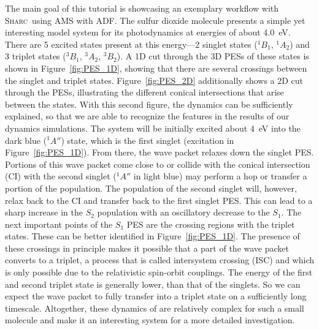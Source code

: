 \documentclass[a4paper,11pt,DIV=15,openany]{scrbook}
\newcommand{\sharc}{\textsc{Sharc}}
\begin{document}
The main goal of this tutorial is showcasing an exemplary workflow with \sharc\ using \textsc{AMS} with \textsc{ADF}. 
The sulfur dioxide molecule presents a simple yet interesting model system for its photodynamics at energies of about 4.0~eV.
There are 5 excited states present at this energy---2 singlet states ($^1B_1$, $^1A_2$) and 3 triplet states ($^3B_1$, $^3A_2$, $^3B_2$).
A 1D cut through the 3D PESs of these states is shown in Figure~\ref{fig:PES_1D}, showing that there are several crossings between the singlet and triplet states.
Figure~\ref{fig:PES_2D} additionally shows a 2D cut through the PESs, illustrating the different conical intersections that arise between the states.
With this second figure, the dynamics can be sufficiently explained, so that we are able to recognize the features in the results of our dynamics simulations. 
The system will be initially excited about 4~eV into the dark blue (${}^1A''$) state, which is the first singlet (excitation in Figure~\ref{fig:PES_1D}). 
From there, the wave packet relaxes down the singlet PES. 
Portions of this wave packet come close to or collide with the conical intersection (CI) with the second singlet (${}^1A''$ in light blue) may perform a hop or transfer a portion of the population. 
The population of the second singlet will, however, relax back to the CI and transfer back to the first singlet PES. This can lead to a sharp increase in the $S_2$ population with an oscillatory decrease to the $S_1$. The next important points of the $S_1$ PES are the crossing regions with the triplet states. 
These can be better identified in Figure~\ref{fig:PES_1D}. 
The presence of these crossings in principle makes it possible that a part of the wave packet converts to a triplet, a process that is called intersystem crossing (ISC) and which is only possible due to the relativistic spin-orbit couplings. 
The energy of the first and second triplet state is generally lower, than that of the singlets.
So we can expect the wave packet to fully transfer into a triplet state on a sufficiently long timescale.
Altogether, these dynamics of  are relatively complex for such a small molecule and make it an interesting system for a more detailed investigation.  

\end{document}
